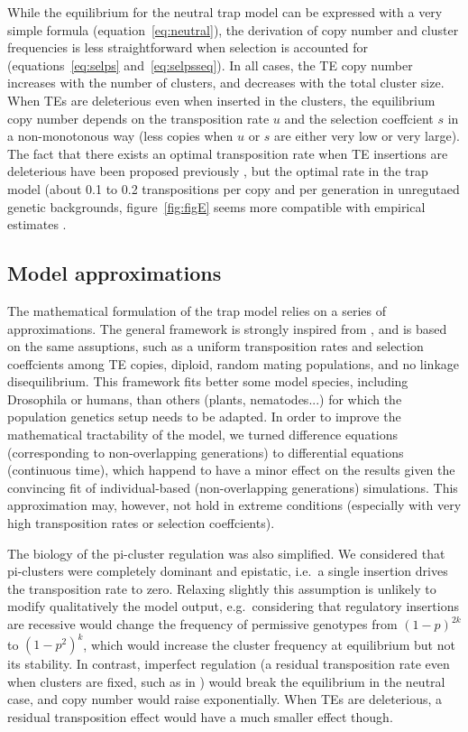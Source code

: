 \documentclass[10pt,a4paper]{article}
\begin{document}
While the equilibrium for the neutral trap model can be expressed with a very simple formula (equation~\ref{eq:neutral}), the derivation of copy number and cluster frequencies is less straightforward when selection is accounted for (equations~\ref{eq:selps} and~\ref{eq:selpsseq}). In all cases, the TE copy number increases with the number of clusters, and decreases with the total cluster size. When TEs are deleterious even when inserted in the clusters, the equilibrium copy number depends on the transposition rate $u$ and the selection coeffcient $s$ in a non-monotonous way (less copies when $u$ or $s$ are either very low or very large). The fact that there exists an optimal transposition rate when TE insertions are deleterious have been proposed previously \citep{LC05}, but the optimal rate in the trap model (about 0.1 to 0.2 transpositions per copy and per generation in unregutaed genetic backgrounds, figure~\ref{fig:figE} seems more compatible with empirical estimates \citep{RLZ+16}. 

\subsection{Model approximations}

The mathematical formulation of the trap model relies on a series of approximations. The general framework is strongly inspired from \cite{CC83}, and is based on the same assuptions, such as a uniform transposition rates and selection coeffcients among TE copies, diploid, random mating populations, and no linkage disequilibrium. This framework fits better some model species, including Drosophila or humans, than others (plants, nematodes...) for which the population genetics setup needs to be adapted. In order to improve the mathematical tractability of the model, we turned difference equations (corresponding to non-overlapping generations) to differential equations (continuous time), which happend to have a minor effect on the results given the convincing fit of individual-based (non-overlapping generations) simulations. This approximation may, however, not hold in extreme conditions (especially with very high transposition rates or selection coeffcients). 

The biology of the pi-cluster regulation was also simplified. We considered that pi-clusters were completely dominant and epistatic, i.e.\ a single insertion drives the transposition rate to zero. Relaxing slightly this assumption is unlikely to modify qualitatively the model output, e.g.\ considering that regulatory insertions are recessive  would change the frequency of permissive genotypes from $(1-p)^{2k}$ to $(1-p^2)^k$, which would increase the cluster frequency at equilibrium but not its stability. In contrast, imperfect regulation (a residual transposition rate even when clusters are fixed, such as in \cite{LC10}) would break the equilibrium in the neutral case, and copy number would raise exponentially. When TEs are deleterious, a residual transposition effect would have a much smaller effect though. 
\end{document}
